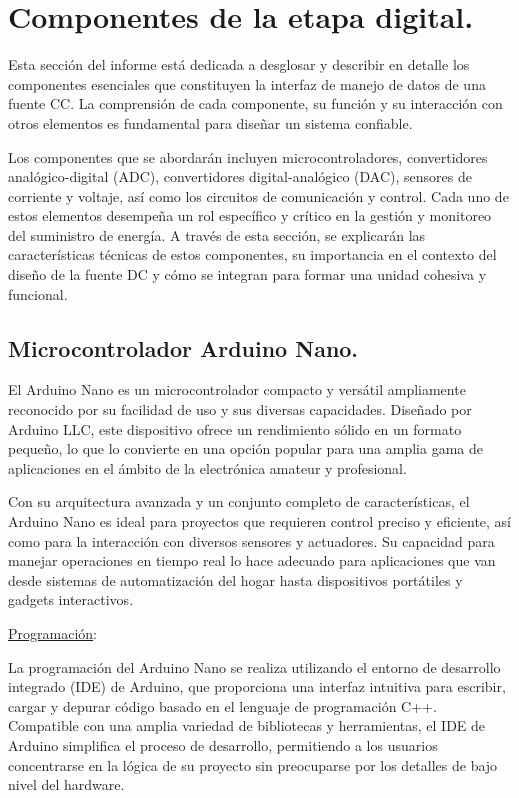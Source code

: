 \section{Componentes de la etapa digital.}
Esta sección del informe está dedicada a desglosar y describir en detalle los componentes esenciales que constituyen la interfaz de manejo de datos de una fuente CC. La comprensión de cada componente, su función y su interacción con otros elementos es fundamental para diseñar un sistema confiable.\par 
Los componentes que se abordarán incluyen microcontroladores, convertidores analógico-digital (ADC), convertidores digital-analógico (DAC), sensores de corriente y voltaje, así como los circuitos de comunicación y control. Cada uno de estos elementos desempeña un rol específico y crítico en la gestión y monitoreo del suministro de energía. A través de esta sección, se explicarán las características técnicas de estos componentes, su importancia en el contexto del diseño de la fuente DC y cómo se integran para formar una unidad cohesiva y funcional.

\subsection{Microcontrolador Arduino Nano.}
El Arduino Nano es un microcontrolador compacto y versátil ampliamente reconocido por su facilidad de uso y sus diversas capacidades. Diseñado por Arduino LLC, este dispositivo ofrece un rendimiento sólido en un formato pequeño, lo que lo convierte en una opción popular para una amplia gama de aplicaciones en el ámbito de la electrónica amateur y profesional.\par 
Con su arquitectura avanzada y un conjunto completo de características, el Arduino Nano es ideal para proyectos que requieren control preciso y eficiente, así como para la interacción con diversos sensores y actuadores. Su capacidad para manejar operaciones en tiempo real lo hace adecuado para aplicaciones que van desde sistemas de automatización del hogar hasta dispositivos portátiles y gadgets interactivos.

\underline{Programación}: \par 
La programación del Arduino Nano se realiza utilizando el entorno de desarrollo integrado (IDE) de Arduino, que proporciona una interfaz intuitiva para escribir, cargar y depurar código basado en el lenguaje de programación C++. Compatible con una amplia variedad de bibliotecas y herramientas, el IDE de Arduino simplifica el proceso de desarrollo, permitiendo a los usuarios concentrarse en la lógica de su proyecto sin preocuparse por los detalles de bajo nivel del hardware.

